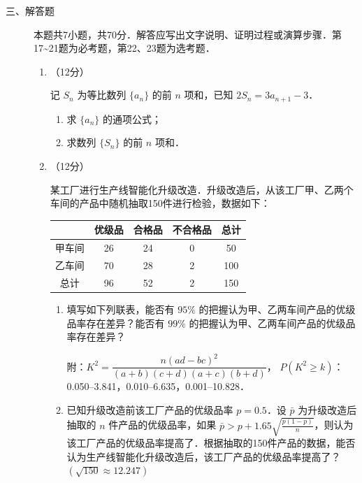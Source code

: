 \begin{description}
    \item[三、解答题] 本题共7小题，共70分．解答应写出文字说明、证明过程或演算步骤．第17\textasciitilde21题为必考题，第22、23题为选考题．
    \begin{enumerate}[leftmargin=5pt]
      \addtocounter{enumi}{+16}
        \item （12分）

        记 $S_n$ 为等比数列 $\{a_n\}$ 的前 $n$ 项和，已知 $2S_n=3a_{n+1}-3$．

        \begin{enumerate}[label=(\arabic*)]
            \item 求 $\{a_n\}$ 的通项公式；
            \item 求数列 $\{S_n\}$ 的前 $n$ 项和．
        \end{enumerate}

        \item （12分）

        某工厂进行生产线智能化升级改造．升级改造后，从该工厂甲、乙两个车间的产品中随机抽取150件进行检验，数据如下：

        {\centering\begin{tabular}{c|c|c|c|c}
        \hline
        & 优级品 & 合格品 & 不合格品 & 总计 \\
        \hline
        甲车间 & 26 & 24 & 0 & 50 \\
        \hline
        乙车间 & 70 & 28 & 2 & 100 \\
        \hline
        总计 & 96 & 52 & 2 & 150 \\
        \hline
        \end{tabular}\par}

        \begin{enumerate}[label=(\arabic*)]
            \item 填写如下列联表，能否有 $95\%$ 的把握认为甲、乙两车间产品的优级品率存在差异？能否有 $99\%$ 的把握认为甲、乙两车间产品的优级品率存在差异？

            附：$K^2=\dfrac{n(ad-bc)^2}{(a+b)(c+d)(a+c)(b+d)}$，
            $P(K^2\geqslant k)$：0.050--3.841，0.010--6.635，0.001--10.828．

            \item 已知升级改造前该工厂产品的优级品率 $p=0.5$．设 $\bar{p}$ 为升级改造后抽取的 $n$ 件产品的优级品率，如果 $\bar{p}>p+1.65\sqrt{\frac{p(1-p)}{n}}$，则认为该工厂产品的优级品率提高了．根据抽取的150件产品的数据，能否认为生产线智能化升级改造后，该工厂产品的优级品率提高了？$(\sqrt{150}\approx12.247)$
        \end{enumerate}


\end{enumerate}
\end{description}
